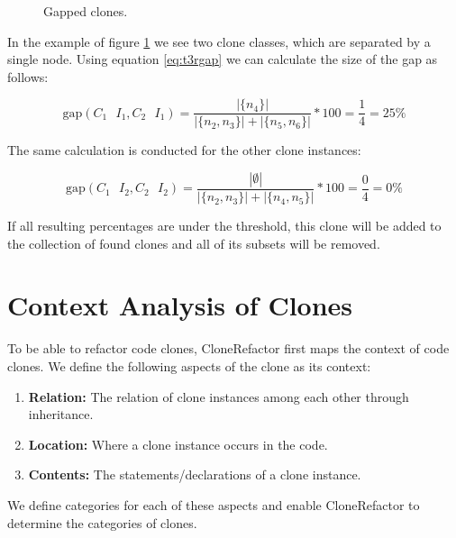 \begin{figure}[H]
\begin{parcolumns}{2}
\end{parcolumns}
\caption{Gapped clones.}
\label{fig:3ropportunities}
\end{figure}

In the example of figure \ref{fig:3ropportunities} we see two clone classes, which are separated by a single node. Using equation \ref{eq:t3rgap} we can calculate the size of the gap as follows:

\begin{equation}\label{eq:t3rexample}
\text{gap}(C_1\text{ }I_1, C_2\text{ }I_1) = \frac{|\{n_4\}|}{|\{n_2, n_3\}| + |\{n_5, n_6\}|} * 100 = \frac{1}{4} = 25\%
\end{equation}

The same calculation is conducted for the other clone instances:

\begin{equation}\label{eq:t3rexample}
\text{gap}(C_1\text{ }I_2, C_2\text{ }I_2) = \frac{|\emptyset|}{|\{n_2, n_3\}| + |\{n_4, n_5\}|} * 100 = \frac{0}{4} = 0\%
\end{equation}

If all resulting percentages are under the threshold, this clone will be added to the collection of found clones and all of its subsets will be removed.

\section{Context Analysis of Clones}\label{chap:contextsetup}
To be able to refactor code clones, CloneRefactor first maps the context of code clones. We define the following aspects of the clone as its context:
\begin{enumerate}
  \item \textbf{Relation:} The relation of clone instances among each other through inheritance.
  \item \textbf{Location:} Where a clone instance occurs in the code.
  \item \textbf{Contents:} The statements/declarations of a clone instance.
\end{enumerate}
We define categories for each of these aspects and enable CloneRefactor to determine the categories of clones.

